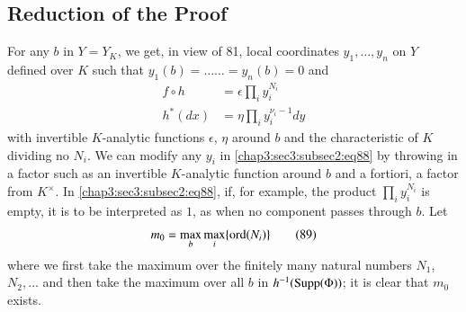 \subsection{Reduction of the Proof}\label{chap3:sec3:subsec2} %

For any $b$ in $Y=Y_{K}$, we get, in view of {81}, local
coordinates $y_{1},\ldots,y_{n}$ on $Y$ defined over $K$ such that
$y_{1}(b)=\ldots\ldots =y_{n}(b)=0$ and
\begin{align*}
  f\circ h &= \epsilon\prod_{i}y^{N_{i}}_{i}\\
  h^{\ast}(dx) &= \eta\prod_{i}y^{\nu_{i}-1}_{i}dy 
  \tag{88}\label{chap3:sec3:subsec2:eq88}
\end{align*}
with invertible $K$-analytic functions $\epsilon$, $\eta$ around $b$
and the characteristic of $K$ dividing no $N_{i}$. We can modify any
$y_{i}$ in \ref{chap3:sec3:subsec2:eq88} by throwing in a factor such
as an invertible 
$K$-analytic function around $b$ and a fortiori, a factor from
$K^{\times}$. In \ref{chap3:sec3:subsec2:eq88}, if, for example, the product
$\prod_{i}y^{N_{i}}_{i}$ is empty, it is to be interpreted as $1$, as
when no component passes through $b$. Let
\begin{equation*}
  m_{0}=\max\limits_{b}\max\limits_{i}\{\operatorname{ord}(N_{i})\}
  \tag{89}\label{chap3:sec3:subsec2:eq89} 
\end{equation*}
where we first take the maximum over the finitely many natural numbers
$N_{1}$, $N_{2},\ldots$ and then take the maximum over all $b$ in
$h^{-1}(\operatorname{Supp}(\Phi))$; it is clear that $m_{0}$ exists. 

